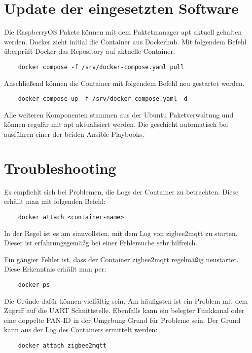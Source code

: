 \section{Update der eingesetzten Software}

Die RaspberryOS Pakete können mit dem Paktetmanager apt aktuell gehalten werden. Docker zieht initial die Container aus Dockerhub.
Mit folgendem Befehl überprüft Docker das Repository auf aktuelle Container.

\begin{lstlisting}
    docker compose -f /srv/docker-compose.yaml pull 
\end{lstlisting}

Anschließend können die Container mit folgendem Befehl neu gestartet werden.

\begin{lstlisting}
    docker compose up -f /srv/docker-compose.yaml -d 
\end{lstlisting}

Alle weiteren Komponenten stammen aus der Ubuntu Paketverwaltung und können regulär mit apt aktualisiert werden. Die geschieht automatisch bei ausführen einer der 
beiden Ansible Playbooks.

\section{Troubleshooting}

Es empfiehlt sich bei Problemen, die Logs der Container zu betrachten. Diese erhällt man mit folgenden Befehl:

\begin{lstlisting}
    docker attach <container-name>
\end{lstlisting}

In der Regel ist es am sinnvollsten, mit dem Log von zigbee2mqtt zu starten. Dieser ist erfahrungsgemäßg bei einer Fehlersuche sehr hilfreich.

Ein gängier Fehler ist, dass der Container zigbee2mqtt regelmäßig neustartet. Diese Erkenntnis erhällt man per:
\begin{lstlisting}
    docker ps
\end{lstlisting}
Die Gründe dafür können vielfältig sein. Am häufigsten ist ein Problem mit dem Zugriff auf die UART Schnittstelle. Ebenfalls kann ein belegter Funkkanal
oder eine doppelte PAN-ID in der Umgebung Grund für Probleme sein. 
Der Grund kann aus der Log des Containers ermittelt werden:
\begin{lstlisting}
    docker attach zigbee2mqtt
\end{lstlisting}




